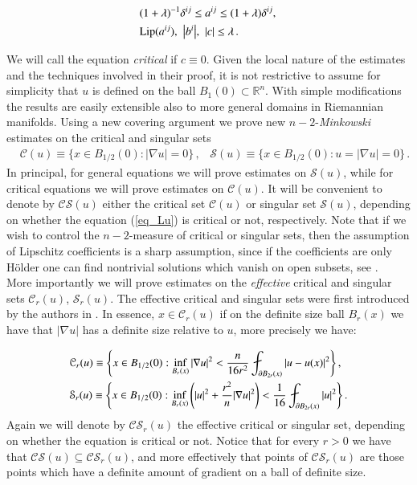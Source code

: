 \documentclass[11pt]{article}
\begin{document}
\begin{align}\label{e:coefficient_estimates}
&(1+\lambda)^{-1}\delta^{ij}\leq a^{ij}\leq (1+\lambda)\delta^{ij}, \,\notag\\
&\text{Lip}(a^{ij}), \,\, {\left|{b^i}\right|},\,\,{\left|{c}\right|}\leq \lambda\, .
\end{align}

We will call the equation {\it critical} if $c\equiv 0$.  Given the local nature of the estimates and the techniques involved in their proof, it is not restrictive to assume for simplicity that $u$ is defined on the ball $B_1(0)\subset {\mathds{R}}^n$. With simple modifications the results are easily extensible also to more general domains in Riemannian manifolds.  Using a new covering argument we prove new $n-2$-{\it Minkowski} estimates on the critical and singular sets
\begin{align}
&{\mathcal{C}}(u)\equiv\{x\in B_{1/2}(0):|\nabla u|=0\}\, ,\,\,\,\,\, {\mathcal{S}}(u)\equiv\{x\in B_{1/2}(0):u=|\nabla u|=0\}\, .
\end{align}
In principal, for general equations we will prove estimates on ${\mathcal{S}}(u)$, while for critical equations we will prove estimates on ${\mathcal{C}}(u)$.  It will be convenient to denote by ${\mathcal{CS}}(u)$ either the critical set ${\mathcal{C}}(u)$ or singular set ${\mathcal{S}}(u)$, depending on whether the equation (\ref{eq_Lu}) is critical or not, respectively.  Note that if we wish to control the $n-2$-measure of critical or singular sets, then the assumption of Lipschitz coefficients is a sharp assumption, since if the coefficients are only H\"older one can find nontrivial solutions which vanish on open subsets, see \cite{plis}. \\ 

More importantly we will prove estimates on the {\it effective} critical and singular sets ${\mathcal{C}}_r(u)$, ${\mathcal{S}}_r(u)$.  The effective critical and singular sets were first introduced by the authors in \cite{chnava}.  In essence, $x\in {\mathcal{C}}_r(u)$ if on the definite size ball $B_r(x)$ we have that $|\nabla u|$ has a definite size relative to $u$, more precisely we have:

\begin{align}\label{e:effective_critical}
&{\mathcal{C}}_r(u)\equiv{\left\{{x\in B_{1/2}(0): \inf_{B_r(x)}|\nabla u|^2 < \frac{n}{16r^2}\fint_{\partial B_{2r}(x)} |u-u(x)|^2}\right\}}\, ,\notag\\
&{\mathcal{S}}_r(u)\equiv{\left\{{x\in B_{1/2}(0): \inf_{B_r(x)}{\left({{\left|{u}\right|}^2 + \frac{r^2}{n} |\nabla u|^2 }\right)} < \frac{1}{16}\fint_{\partial B_{2r}(x)} |u|^2}\right\}}\, .
\end{align}
Again we will denote by ${\mathcal{CS}}_r(u)$ the effective critical or singular set, depending on whether the equation is critical or not.  Notice that for every $r>0$ we have that ${\mathcal{CS}}(u)\subseteq {\mathcal{CS}}_r(u)$, and more effectively that points of ${\mathcal{CS}}_r(u)$ are those points which have a definite amount of gradient on a ball of definite size.
\end{document}
